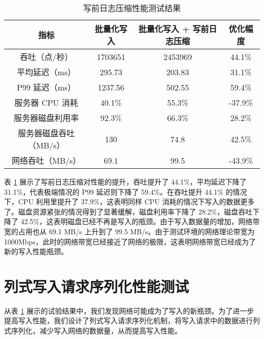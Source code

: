 \begin{table}
  \centering
  \caption{写前日志压缩性能测试结果}
  \begin{tabular}{cccc}
    \toprule 
    指标 & 批量化写入 & 批量化写入 + 写前日志压缩 & 优化幅度 \\
    \midrule
    吞吐（点/秒） & 1703651 & 2453969 & 44.1\%\\
    平均延迟（ms） & 295.73 & 203.83 & 31.1\%\\
    P99 延迟（ms） & 1237.56 & 502.55& 59.4\% \\
    服务器 CPU 消耗 & 40.1\% & 	55.3\% & -37.9\%\\
    服务器磁盘利用率 & 92.3\% & 	66.3\% & 28.2\%\\
    服务器磁盘吞吐（MB/s） & 130 & 	74.8 & 42.5\% \\
    网络吞吐（MB/s） & 69.1 & 	99.5 & -43.9\%\\
    \bottomrule 
  \end{tabular}
  \label{tabular:wal-compression-performance}
\end{table}

表 \ref{tabular:wal-compression-performance} 展示了写前日志压缩对性能的提升，吞吐提升了 44.1\%，平均延迟下降了 31.1\%，代表极端情况的 P99 延迟则下降了 59.4\%。在吞吐提升 44.1\% 的情况下，CPU 利用里提升了 37.9\%，这表明同样 CPU 消耗的情况下写入的数据更多了。磁盘资源紧张的情况得到了显著缓解，磁盘利用率下降了 28.2\%，磁盘吞吐下降了 42.5\%，这表明磁盘已经不再是写入的瓶颈。由于写入数据量的增加，网络带宽的占用也从 69.1 MB/s 上升到了 99.5 MB/s。由于测试环境的网络理论带宽为 1000Mbps，此时的网络带宽已经接近了网络的极限，这表明网络带宽已经成为了新的写入性能瓶颈。


\section{列式写入请求序列化性能测试}
从表 \ref{tabular:wal-compression-performance} 展示的试验结果中，我们发现网络可能成为了写入的新瓶颈。为了进一步提高写入性能，我们设计了列式写入请求序列化机制，将写入请求中的数据进行列式序列化，减少写入网络的数据量，从而提高写入性能。

